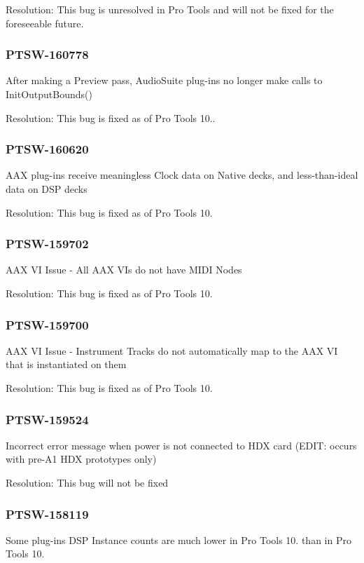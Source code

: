 Resolution\+: This bug is unresolved in Pro Tools and will not be fixed for the foreseeable future.\hypertarget{a00846_PTSW-160778}{}\subsubsection{P\+T\+S\+W-\/160778}\label{a00846_PTSW-160778}
After making a Preview pass, Audio\+Suite plug-\/ins no longer make calls to Init\+Output\+Bounds()

Resolution\+: This bug is fixed as of Pro Tools 10..\hypertarget{a00846_PTSW-160620}{}\subsubsection{P\+T\+S\+W-\/160620}\label{a00846_PTSW-160620}
A\+AX plug-\/ins receive meaningless Clock data on Native decks, and less-\/than-\/ideal data on D\+SP decks

Resolution\+: This bug is fixed as of Pro Tools 10.\hypertarget{a00846_PTSW-159702}{}\subsubsection{P\+T\+S\+W-\/159702}\label{a00846_PTSW-159702}
A\+AX VI Issue -\/ All A\+AX V\+Is do not have M\+I\+DI Nodes

Resolution\+: This bug is fixed as of Pro Tools 10.\hypertarget{a00846_PTSW-159700}{}\subsubsection{P\+T\+S\+W-\/159700}\label{a00846_PTSW-159700}
A\+AX VI Issue -\/ Instrument Tracks do not automatically map to the A\+AX VI that is instantiated on them

Resolution\+: This bug is fixed as of Pro Tools 10.\hypertarget{a00846_PTSW-159524}{}\subsubsection{P\+T\+S\+W-\/159524}\label{a00846_PTSW-159524}
Incorrect error message when power is not connected to H\+DX card (E\+D\+IT\+: occurs with pre-\/\+A1 H\+DX prototypes only)

Resolution\+: This bug will not be fixed\hypertarget{a00846_PTSW-158119}{}\subsubsection{P\+T\+S\+W-\/158119}\label{a00846_PTSW-158119}
Some plug-\/ins\textquotesingle{} D\+SP Instance counts are much lower in Pro Tools 10. than in Pro Tools 10.

